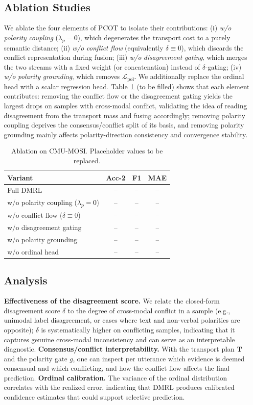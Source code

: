 \documentclass[conference]{IEEEtran}
\begin{document}
\subsection{Ablation Studies}
We ablate the four elements of PCOT to isolate their contributions:
(i) \emph{w/o polarity coupling} ($\lambda_p{=}0$), which degenerates the transport
cost to a purely semantic distance;
(ii) \emph{w/o conflict flow} (equivalently $\delta{\equiv}0$), which discards the
conflict representation during fusion;
(iii) \emph{w/o disagreement gating}, which merges the two streams with a fixed
weight (or concatenation) instead of $\delta$-gating;
(iv) \emph{w/o polarity grounding}, which removes $\mathcal{L}_{\text{pol}}$.
We additionally replace the ordinal head with a scalar regression head.
Table~\ref{tab:ablation} (to be filled) shows that each element contributes:
removing the conflict flow or the disagreement gating yields the largest drops on
samples with cross-modal conflict, validating the idea of reading disagreement from
the transport mass and fusing accordingly; removing polarity coupling deprives the
consensus/conflict split of its basis, and removing polarity grounding mainly
affects polarity-direction consistency and convergence stability.

\begin{table}[t]
\centering
\caption{Ablation on CMU-MOSI. Placeholder values to be replaced.}
\label{tab:ablation}
\begin{tabular}{lccc}
\toprule
Variant & Acc-2 & F1 & MAE\\
\midrule
Full DMRL & -- & -- & --\\
\;\;w/o polarity coupling ($\lambda_p{=}0$) & -- & -- & --\\
\;\;w/o conflict flow ($\delta{\equiv}0$) & -- & -- & --\\
\;\;w/o disagreement gating & -- & -- & --\\
\;\;w/o polarity grounding & -- & -- & --\\
\;\;w/o ordinal head & -- & -- & --\\
\bottomrule
\end{tabular}
\end{table}

\subsection{Analysis}
\textbf{Effectiveness of the disagreement score.} We relate the closed-form
disagreement score $\delta$ to the degree of cross-modal conflict in a sample (e.g.,
unimodal label disagreement, or cases where text and non-verbal polarities are
opposite); $\delta$ is systematically higher on conflicting samples, indicating that
it captures genuine cross-modal inconsistency and can serve as an interpretable
diagnostic.
\textbf{Consensus/conflict interpretability.} With the transport plan $\mathbf{T}$
and the polarity gate $g$, one can inspect per utterance which evidence is deemed
consensual and which conflicting, and how the conflict flow affects the final
prediction.
\textbf{Ordinal calibration.} The variance of the ordinal distribution correlates
with the realized error, indicating that DMRL produces calibrated confidence
estimates that could support selective prediction.
\end{document}
